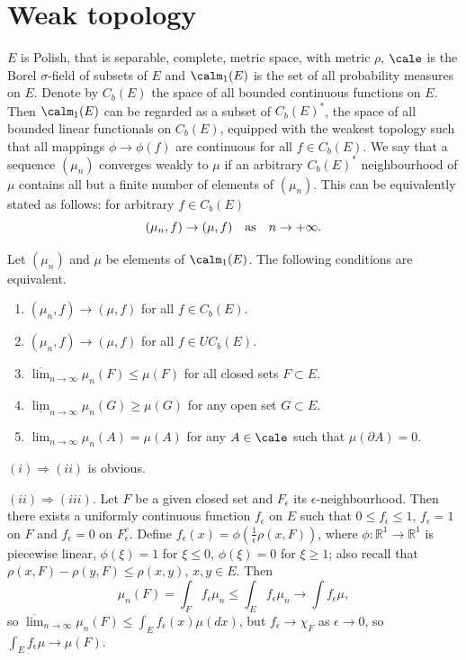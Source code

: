 \documentclass[preprint]{imsart}
\def\R{\mathbb R}
\begin{document}
{\section{Weak topology}

$E$ is Polish,
that is separable, complete, metric space,
 with metric $\rho$, $\cale$ is the Borel
$\sigma$-field of subsets of $E$ and $\calm_1(E)$ is
the set of all probability measures on $E$. Denote by
$C_b(E)$ the space of all bounded continuous functions
on $E$. Then $\calm_1(E)$ can be regarded as a subset
of $C_b(E)^*$, the space of all bounded linear
functionals on $C_b(E)$, equipped with the
weakest topology
such that all mappings $\phi\to\phi (f)$ are continuous
for all $f\in C_b(E)$.
We say that a sequence
$(\mu_n)$ converges weakly to $\mu$ if an arbitrary
$C_b(E)^*$ neighbourhood of $\mu$ contains all but a
finite number of elements of $(\mu_n)$. This can be
equivalently stated as follows:
for arbitrary $f\in C_b(E)$
\begin{equation}\label{weakconv}
(\mu_n,f)\to (\mu,f)\quad {\rm as}\quad n\to +\infty.
\end{equation}



\begin{Proposition}
Let $(\mu_n)$ and $\mu $ be elements of $\calm_1(E)$.
The following conditions are equivalent.
\begin{enumerate}
  \item[(i)] $(\mu_n,f)\to (\mu,f)$ for all $f\in C_b(E)$.

  \item[(ii)] $(\mu_n,f)\to (\mu,f)$ for all $f\in UC_b(E)$.

  \item[(iii)] $\overline{\lim}_{n\to\infty}
  \mu_n(F)\leq \mu(F)$ for all closed sets $F\subset E$.

\item[(iv)] $\underline{\lim}_{n\to\infty}
  \mu_n(G)\geq \mu(G)$ for any open set $G\subset E$.

\item[(v)] $ {\lim}_{n\to\infty}
  \mu_n(A)=\mu(A)$ for any   $A\in\cale$
   such that $\mu(\partial A)=0$.
\end{enumerate}
\end{Proposition}

$(i)\Rightarrow (ii)$ is obvious.


$(ii)\Rightarrow (iii)$. Let $F$ be a given closed set
and $F_\epsilon$ its $\epsilon$-neighbourhood. Then
there exists a uniformly continuous function
$f_\epsilon$ on $E$ such that $0\leq f_\epsilon \leq
1$, $f_\epsilon
=1$ on $F$ and $f_\epsilon =0$ on $F_\epsilon^c$.
Define
$f_\epsilon(x)=\phi(\frac{1}{\epsilon}\rho(x,F))$,
where $\phi :\R^1\to\R^1$ is piecewise linear,
$\phi(\xi)=1$ for $\xi\leq 0$, $\phi(\xi)=0$ for
$\xi\geq 1$; also recall that $\rho(x,F)-\rho(y,F)\leq
\rho(x,y)$, $x,y\in E$. Then
$$
\mu_n(F)=\int_F f_\epsilon\mu_n\leq
\int_Ef_\epsilon\mu_n\to\int f_\epsilon\mu,
$$
so $\overline{\lim}_{n\to\infty}
  \mu_n(F)\leq \int_E f_\epsilon(x)\mu(dx)$, but
$f_\epsilon\to \chi_F$ as $\epsilon\to 0$, so $\int_E
f_\epsilon \mu\to \mu(F)$.


}
\end{document}

